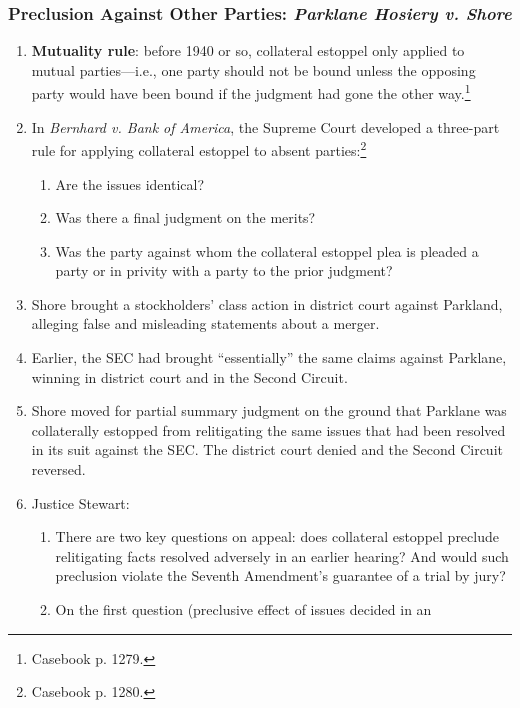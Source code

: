 \subsubsection{Preclusion Against Other Parties: \emph{Parklane Hosiery v. Shore}}

\begin{enumerate}
    \item \textbf{Mutuality rule}: before 1940 or so, collateral estoppel only 
    applied to mutual parties---i.e., one party should not be bound unless the 
    opposing party would have been bound if the judgment had gone the other 
    way.\footnote{Casebook p. 1279.}
    \item In \emph{Bernhard v. Bank of America}, the Supreme Court developed a 
    three-part rule for applying collateral estoppel to absent 
    parties:\footnote{Casebook p. 1280.}
    \begin{enumerate}
        \item Are the issues identical?
        \item Was there a final judgment on the merits?
        \item Was the party against whom the collateral estoppel plea is 
        pleaded a party or in privity with a party to the prior judgment?
    \end{enumerate}
    \item Shore brought a stockholders' class action  in district court 
    against Parkland, alleging false and misleading statements about a merger.
    \item Earlier, the SEC had brought ``essentially'' the same claims against 
    Parklane, winning in district court and in the Second Circuit.
    \item Shore moved for partial summary judgment on the ground that Parklane 
    was collaterally estopped from relitigating the same issues that had been 
    resolved in its suit against the SEC. The district court denied and the 
    Second Circuit reversed.
    \item Justice Stewart:
    \begin{enumerate}
        \item There are two key questions on appeal: does collateral estoppel 
        preclude relitigating facts resolved adversely in an earlier hearing? 
        And would such preclusion violate the Seventh Amendment's guarantee of 
        a trial by jury?
        \item On the first question (preclusive effect of issues decided in an 

\end{enumerate}
\end{enumerate}
